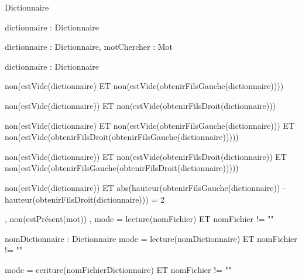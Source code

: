 \begin{algorithme}
		{}%
		{Dictionnaire}
	
		{dictionnaire : Dictionnaire}%
		{\booleen}
	
		{dictionnaire : Dictionnaire, motChercher : Mot}%
		{\booleen}

		{dictionnaire : Dictionnaire}%
		{\entier}

		{}%
		{non(estVide(dictionnaire) ET non(estVide(obtenirFilsGauche(dictionnaire))))}

		{}%
		{non(estVide(dictionnaire)) ET non(estVide(obtenirFilsDroit(dictionnaire)))}

		{}
		{non(estVide(dictionnaire) ET non(estVide(obtenirFilsGauche(dictionnaire))) ET non(estVide(obtenirFilsDroit(obtenirFilsGauche(dictionnaire)))))}
	
		{}%
		{non(estVide(dictionnaire)) ET non(estVide(obtenirFilsDroit(dictionnaire)) ET non(estVide(obtenirFilsGauche(obtenirFilsDroit(dictionnaire)))))}

		{}%
		{non(estVide(dictionnaire)) ET abs(hauteur(obtenirFilsGauche(dictionnaire)) - hauteur(obtenirFilsDroit(dictionnaire))) = 2}

		{,}
		{non(estPrésent(mot))}
		{, }%
		{mode = lecture(nomFichier)  ET nomFichier != ""}

		{nomDictionnaire : \chaine}
		{Dictionnaire}
		{mode = lecture(nomDictionnaire) ET nomFichier != ""}

		{}%
		{mode = ecriture(nomFichierDictionnaire) ET nomFichier != ""}

	
\end{algorithme}
